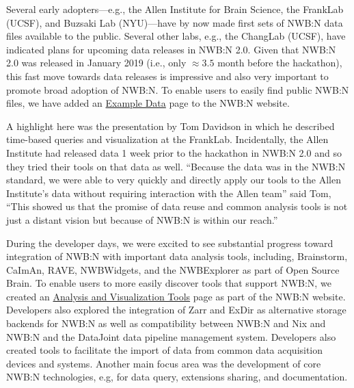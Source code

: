 \documentclass{article}
\begin{document}
Several early adopters---e.g., the Allen Institute for Brain Science, the FrankLab (UCSF), and Buzsaki Lab (NYU)---have by now made first sets of NWB:N data files available to the public. Several other labs, e.g., the ChangLab (UCSF), have indicated plans for upcoming data releases in NWB:N 2.0. Given that NWB:N 2.0 was released in January 2019 (i.e., only $\approx3.5$ month before the hackathon), this fast move towards data releases is impressive and also very important to promote broad adoption of NWB:N. To enable users to easily find public NWB:N files, we have added an \href{https://neurodatawithoutborders.github.io/exampledata}{Example Data} page to the NWB:N website. 

A highlight here was the presentation by Tom Davidson in which he described time-based queries and visualization at the FrankLab. Incidentally, the Allen Institute had released data 1 week prior to the hackathon in NWB:N 2.0 and so they tried their tools on that data as well. ``Because the data was in the NWB:N standard, we were able to very quickly and directly apply our tools to the Allen Institute's data without requiring interaction with the Allen team'' said Tom, ``This showed us that the promise of data reuse and common analysis tools is not just a distant vision but because of NWB:N is within our reach.''

During the developer days, we were excited to see substantial progress toward integration of NWB:N with important data analysis tools, including, Brainstorm, CaImAn, RAVE, NWBWidgets, and the NWBExplorer as part of Open Source Brain. To enable users to more easily discover tools that support NWB:N, we created an \href{https://neurodatawithoutborders.github.io/tools}{Analysis and Visualization Tools} page as part of the NWB:N website. Developers also explored the integration of Zarr and ExDir as alternative storage backends for NWB:N as well as compatibility between NWB:N and Nix and NWB:N and the DataJoint data pipeline management system. Developers also created tools to facilitate the import of data from common data acquisition devices and systems. Another main focus area was the development of core NWB:N technologies, e.g, for data query, extensions sharing, and documentation. 

\vspace{-0.2cm}
\end{document}
